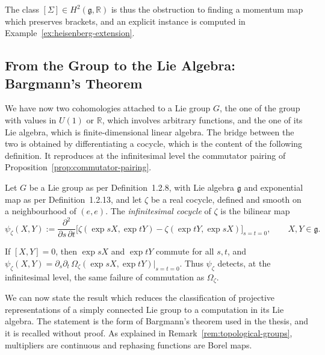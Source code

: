 \noindent The class $[\Sigma]\in H^2(\mathfrak{g},\mathbb{R})$ is thus the obstruction to finding a momentum map which preserves brackets, and an explicit instance is computed in Example~\ref{ex:heisenberg-extension}.

\subsection{From the Group to the Lie Algebra: Bargmann's Theorem}\label{subsec:bargmann}

We have now two cohomologies attached to a Lie group $G$, the one of the group with values in $U(1)$ or $\mathbb{R}$, which involves arbitrary functions, and the one of its Lie algebra, which is finite-dimensional linear algebra. The bridge between the two is obtained by differentiating a cocycle, which is the content of the following definition. It reproduces at the infinitesimal level the commutator pairing of Proposition~\ref{prop:commutator-pairing}.

\begin{definition}\label{def:infinitesimal-cocycle}
	Let $G$ be a Lie group as per Definition~1.2.8, with Lie algebra $\mathfrak{g}$ and exponential map as per Definition~1.2.13, and let $\zeta$ be a real cocycle, defined and smooth on a neighbourhood of $(e,e)$. The \emph{infinitesimal cocycle} of $\zeta$ is the bilinear map
	\begin{equation*}
		\psi_\zeta(X,Y):=\frac{\partial^2}{\partial s\,\partial t}\Big[\zeta(\exp sX,\exp tY)-\zeta(\exp tY,\exp sX)\Big]_{s=t=0}, \qquad X,Y\in\mathfrak{g}.
	\end{equation*}
\end{definition}

\begin{remark}
	If $[X,Y]=0$, then $\exp sX$ and $\exp tY$ commute for all $s,t$, and $\psi_\zeta(X,Y)=\partial_s\partial_t\,\Omega_\zeta(\exp sX,\exp tY)|_{s=t=0}$. Thus $\psi_\zeta$ detects, at the infinitesimal level, the same failure of commutation as $\Omega_\zeta$.
\end{remark}

We can now state the result which reduces the classification of projective representations of a simply connected Lie group to a computation in its Lie algebra. The statement is the form of Bargmann's theorem used in the thesis, and it is recalled without proof. As explained in Remark~\ref{rem:topological-groups}, multipliers are continuous and rephasing functions are Borel maps.

